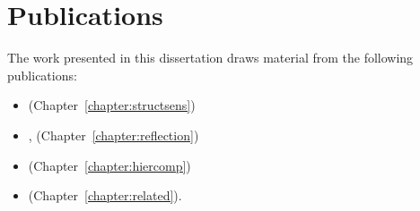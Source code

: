 \section{Publications}

The work presented in this dissertation draws material from the
following publications:

\begin{itemize}[--]
\item \emph{} \cite{structsens}
  (Chapter~\ref{chapter:structsens})
\item \emph{} \cite{reflection},
  (Chapter~\ref{chapter:reflection})
\item \emph{} \cite{jphantom}
  (Chapter~\ref{chapter:hiercomp})
\item \emph{} \cite{survey}
  (Chapter~\ref{chapter:related}).
\end{itemize}

